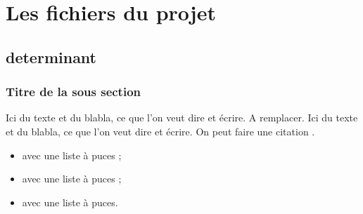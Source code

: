 \chapter{Les fichiers du projet}


\section{determinant}

\subsection{Titre de la sous section}

Ici du texte et du blabla, ce que l'on veut dire et écrire. A remplacer. Ici du texte et du blabla, ce que l'on veut dire et écrire. On peut faire une citation \cite{Motclef1}.

\begin{itemize}
	\item avec une liste à puces ;
	\item avec une liste à puces ;
	\item avec une liste à puces.
\end{itemize}


\clearpage
